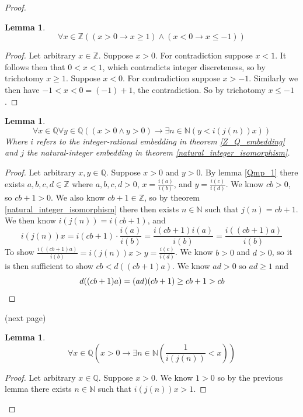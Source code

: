 \documentclass{report}
\newtheorem{lemma}[theo]{Lemma}
\begin{document}
\begin{proof}
\begin{lemma}
\begin{equation*}
\forall x\in\mathbb Z((x>0\to x\geq1)\land(x<0\to x\leq-1))
\end{equation*}
\end{lemma}
\begin{proof}
Let arbitrary $x\in\mathbb Z$. Suppose $x>0$. For contradiction suppose $x<1$. It follows then that $0<x<1$, which contradicts integer
discreteness, so by 
trichotomy $x\geq1$. Suppose
$x<0$. For contradiction suppose $x>-1$. Similarly we then have $-1<x<0=(-1)+1$, the contradiction. So by trichotomy $x\leq-1$.
\end{proof}
\begin{lemma}\label{NQ_1}
\begin{equation*}
\forall x\in\mathbb Q\forall y\in\mathbb Q((x>0\land y>0)\to\exists n\in\mathbb N(y<i(j(n))x))
\end{equation*}
Where $i$ refers to the integer-rational embedding in theorem \ref{Z_Q_embedding} and $j$ the natural-integer embedding in theorem 
\ref{natural_integer_isomorphism}.
\end{lemma}
\begin{proof}
Let arbitrary $x,y\in\mathbb Q$. Suppose $x>0$ and $y>0$. By lemma \ref{Qmp_1} there exists $a,b,c,d\in\mathbb Z$ where $a,b,c,d>0$, 
$x=\frac{i(a)}{i(b)}$, and $y=\frac{i(c)}{i(d)}$. 
We know $cb>0$, so $cb+1>0$. We also know $cb+1\in\mathbb Z$, so
by theorem \ref{natural_integer_isomorphism} there then exists $n\in\mathbb N$ such that $j(n)=cb+1$.
We then know $i(j(n))=i(cb+1)$, and
\begin{equation*}
i(j(n))x=i(cb+1)\cdot\frac{i(a)}{i(b)}=\frac{i(cb+1)i(a)}{i(b)}=\frac{i((cb+1)a)}{i(b)}
\end{equation*}
To show $\frac{i((cb+1)a)}{i(b)}=i(j(n))x>y=\frac{i(c)}{i(d)}$. We know $b>0$ and $d>0$, so it is then sufficient to show 
$cb<d((cb+1)a)$. We know $ad>0$ so $ad\geq1$ and
\begin{equation*}
d((cb+1)a)=(ad)(cb+1)\geq cb+1>cb\qedhere
\end{equation*}
\end{proof}
\noindent(next page)
\newpage
\begin{lemma}
\begin{equation*}
\forall x\in\mathbb Q\left(x>0\to\exists n\in\mathbb N\left(\frac{1}{i(j(n))}<x\right)\right) 
\end{equation*}
\end{lemma}
\begin{proof}
Let arbitrary $x\in\mathbb Q$. Suppose $x>0$. We know $1>0$ so by the previous lemma there exists $n\in\mathbb N$ such that $i(j(n))x>1$. 

\end{proof}
\end{proof}
\end{document}
